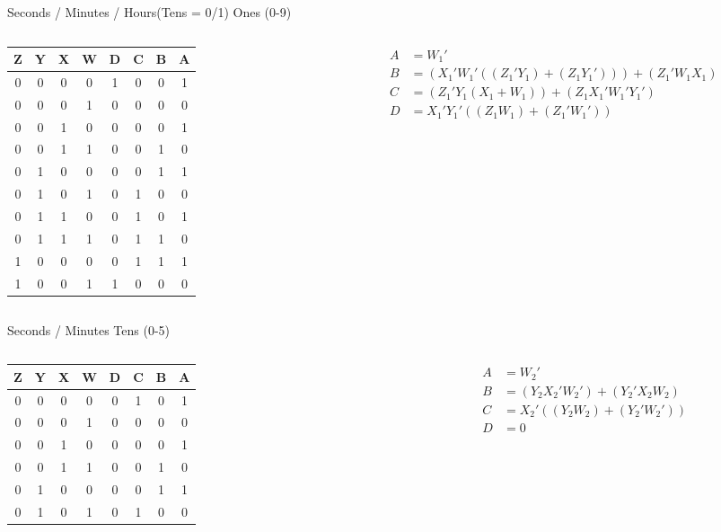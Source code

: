 \documentclass{beamer}
\begin{document}
\begin{frame}{Seconds / Minutes / Hours(Tens = 0/1) Ones (0-9)}
\begin{columns}
\begin{column}{0.5\textwidth}
\centering
\begin{tabular}{|c|c|c|c||c|c|c|c|}
\hline
Z & Y & X & W & D & C & B & A\\
\hline
0&0&0&0&1&0&0&1\\
0&0&0&1&0&0&0&0\\
0&0&1&0&0&0&0&1\\
0&0&1&1&0&0&1&0\\
0&1&0&0&0&0&1&1\\
0&1&0&1&0&1&0&0\\
0&1&1&0&0&1&0&1\\
0&1&1&1&0&1&1&0\\
1&0&0&0&0&1&1&1\\
1&0&0&1&1&0&0&0\\
\hline
\end{tabular}
\end{column}
\begin{column}{0.5\textwidth}
\begin{align*}
A &= W_1'\\
B &= (X_1' W_1' ((Z_1' Y_1) + (Z_1 Y_1'))) + (Z_1' W_1 X_1)\\
C &= (Z_1' Y_1 (X_1 + W_1)) + (Z_1 X_1' W_1' Y_1')\\
D &= X_1' Y_1' ((Z_1 W_1) + (Z_1' W_1'))
\end{align*}
\end{column}
\end{columns}
\end{frame}

\begin{frame}{Seconds / Minutes Tens (0-5)}
\begin{columns}
\begin{column}{0.5\textwidth}
\centering
\begin{tabular}{|c|c|c|c||c|c|c|c|}
\hline
Z & Y & X & W & D & C & B & A\\
\hline
0&0&0&0&0&1&0&1\\
0&0&0&1&0&0&0&0\\
0&0&1&0&0&0&0&1\\
0&0&1&1&0&0&1&0\\
0&1&0&0&0&0&1&1\\
0&1&0&1&0&1&0&0\\
\hline
\end{tabular}
\end{column}
\begin{column}{0.5\textwidth}
\begin{align*}
A &= W_2'\\
B &= (Y_2 X_2' W_2') + (Y_2' X_2 W_2)\\
C &= X_2' ((Y_2 W_2) + (Y_2' W_2'))\\
D &= 0
\end{align*}
\end{column}
\end{columns}
\end{frame}
\end{document}
